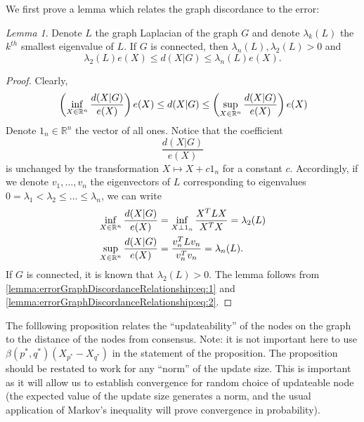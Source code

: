 \documentclass{article}
\theoremstyle{remark}
\newtheorem{lemma}{Lemma}
\newcommand{\R}[0]{\mathbb{R}}
\begin{document}
We first prove a lemma which relates the graph discordance to the error:
\begin{lemma}{\label{lemma:errorGraphDiscordanceRelationship}}
	Denote $L$ the graph Laplacian of the graph $G$ and denote $\lambda_k(L)$ the $k^{th}$ smallest eigenvalue of $L$.  If $G$ is connected, then $\lambda_n(L),\lambda_2(L)>0$ and 
	\begin{equation*}
		\lambda_{2}(L)e(X) \leq d(X|G) \leq \lambda_{n}(L)e(X).
	\end{equation*}
\end{lemma}
\begin{proof}
	Clearly,
	\begin{equation}{\label{lemma:errorGraphDiscordanceRelationship:eq:1}}
		\left(\inf_{X\in\R^n}\frac{d(X|G)}{e(X)}\right)e(X) \leq  d(X|G) \leq \left(\sup_{X\in\R^n}\frac{d(X|G)}{e(X)}\right)e(X) 
	\end{equation}
	Denote $1_n\in\R^n$ the vector of all ones. Notice that the coefficient
	\begin{equation*}
		\frac{d(X|G)}{e(X)}	
	\end{equation*}
	is unchanged by the transformation $X\mapsto X + c1_n$ for a constant $c$. Accordingly, if we denote $v_1,\ldots,v_{n}$ the eigenvectors of $L$ corresponding to eigenvalues $0=\lambda_1<\lambda_2\leq\ldots\leq\lambda_n$, we can write
	\begin{equation}{\label{lemma:errorGraphDiscordanceRelationship:eq:2}}
	\begin{aligned}
		\inf_{X\in\R^n}\frac{d(X|G)}{e(X)} &= \inf_{X\perp 1_n}\frac{X^TLX}{X^TX} = \lambda_2(L)\\
		\sup_{X\in\R^n}\frac{d(X|G)}{e(X)} &= \frac{v_n^TLv_n}{v_n^Tv_n} = \lambda_n(L).
	\end{aligned}
	\end{equation}
	If $G$ is connected, it is known that $\lambda_2(L)>0$. The lemma follows from \eqref{lemma:errorGraphDiscordanceRelationship:eq:1} and \eqref{lemma:errorGraphDiscordanceRelationship:eq:2}.
\end{proof}
The folllowing proposition relates the ``updateability'' of the nodes on the graph to the distance of the nodes from consensus. Note: it is not important here to use $\beta(p^*,q^*)(X_{p^*}-X_{q^*})$ in the statement of the proposition. The proposition should be restated to work for any ``norm'' of the update size. This is important as it will allow us to establish convergence for random choice of updateable node (the expected value of the update size generates a norm, and the usual application of Markov's inequality will prove convergence in probability). 
\end{document}
